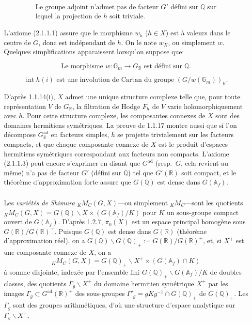 \documentclass[12pt,a4paper]{article}
\theoremstyle{plain}
\theoremstyle{definition}
\theoremstyle{remark}
\DeclareMathOperator{\Int}{int}
\newcommand{\QQ}{\mathbb{Q}}
\newcommand{\RR}{\mathbb{R}}
\newcommand{\Af}{\mathbb{A}_f}
\newcommand{\Gm}{\mathbb{G}}
\begin{document}
\begin{equation}\label{eq:2.1.1.3}
\begin{array}{l}
\text{Le groupe adjoint n'admet pas de facteur } G' \text{ d\'efini sur } \QQ \text{ sur}\\
\text{lequel la projection de } h \text{ soit triviale.}
\end{array}
\end{equation}

L'axiome (2.1.1.1) assure que le morphisme $w_h$ ($h \in X$) est \`a valeurs dans le centre de $G$, donc est ind\'ependant de $h$. On le note $w_X$, ou simplement $w$. Quelques simplifications apparaissent lorsqu'on suppose que:

\begin{equation}\label{eq:2.1.1.4}
\text{Le morphisme } w:\Gm_m \to G_{\RR} \text{ est d\'efini sur } \QQ.
\end{equation}

\begin{equation}\label{eq:2.1.1.5}
\Int h(i) \text{ est une involution de Cartan du groupe } (G/w(\Gm_m))_{\RR}.
\end{equation}

D'apr\`es 1.1.14(i), $X$ admet une unique structure complexe telle que, pour toute repr\'esentation $V$ de $G_{\RR}$, la filtration de Hodge $F_h$ de $V$ varie holomorphiquement avec $h$. Pour cette structure complexe, les composantes connexes de $X$ sont des domaines hermitiens sym\'etriques. La preuve de 1.1.17 montre aussi que si l'on d\'ecompose $G^{\text{ad}}_{\RR}$ en facteurs simples, $h$ se projette trivialement sur les facteurs compacts, et que chaque composante connexe de $X$ est le produit d'espaces hermitiens sym\'etriques correspondant aux facteurs non compacts. L'axiome (2.1.1.3) peut encore s'exprimer en disant que $G^{\text{ad}}$ (resp.~$G$, cela revient au m\^eme) n'a pas de facteur $G'$ (d\'efini sur $\QQ$) tel que $G'(\RR)$ soit compact, et le th\'eor\`eme d'approximation forte assure que $G(\QQ)$ est dense dans $G(\Af)$.

\subsubsection{}

Les \textit{vari\'et\'es de Shimura} ${}_K M_C(G,X)$---ou simplement ${}_K M_C$---sont les quotients ${}_K M_C(G,X) = G(\QQ)\backslash X \times (G(\Af)/K)$ pour $K$ un sous-groupe compact ouvert de $G(\Af)$. D'apr\`es 1.2.7, $\pi_0(X)$ est un espace principal homog\`ene sous $G(\RR)/G(\RR)^+$. Puisque $G(\QQ)$ est dense dans $G(\RR)$ (th\'eor\`eme d'approximation r\'eel), on a $G(\QQ)\backslash G(\QQ)_+ := G(\RR)/G(\RR)^+$, et, si $X^+$ est une composante connexe de $X$, on a
\[
{}_K M_C(G,X) = G(\QQ)_+\backslash X^+ \times (G(\Af)\cap K)
\]
\`a somme disjointe, index\'ee par l'ensemble fini $G(\QQ)_+\backslash G(\Af)/K$ de doubles classes, des quotients $\Gamma_g\backslash X^+$ du domaine hermitien sym\'etrique $X^+$ par les images $\Gamma_g \subset G^{\text{ad}}(\RR)^+$ des sous-groupes $\Gamma'_g = gKg^{-1} \cap G(\QQ)_+$ de $G(\QQ)_+$. Les $\Gamma_g$ sont des groupes arithm\'etiques, d'o\`u une structure d'espace analytique sur $\Gamma_g\backslash X^+$.
\end{document}
